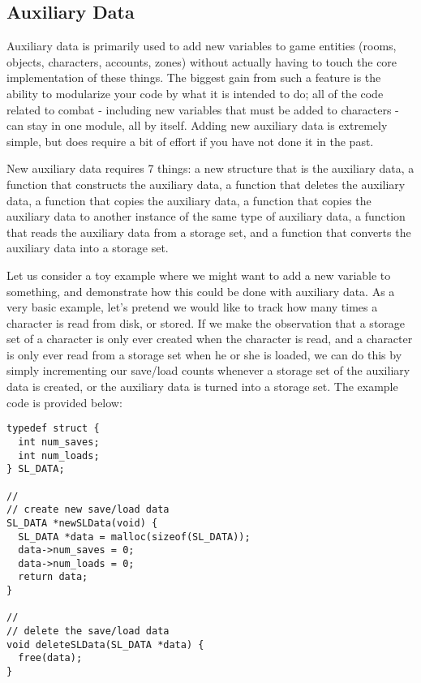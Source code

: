 \documentclass[fignum,doc]{article}
\begin{document}
\begin{doublespace}
\section{Auxiliary Data}
Auxiliary data is primarily used to add new variables to game entities (rooms, objects, characters, accounts, zones) without actually having to touch the core implementation of these things. The biggest gain from such a feature is the ability to modularize your code by what it is intended to do; all of the code related to combat - including new variables that must be added to characters - can stay in one module, all by itself. Adding new auxiliary data is extremely simple, but does require a bit of effort if you have not done it in the past. 

New auxiliary data requires 7 things: a new structure that is the auxiliary data, a function that constructs the auxiliary data, a function that deletes the auxiliary data, a function that copies the auxiliary data, a function that copies the auxiliary data to another instance of the same type of auxiliary data, a function that reads the auxiliary data from a storage set, and a function that converts the auxiliary data into a storage set.

Let us consider a toy example where we might want to add a new variable to something, and demonstrate how this could be done with auxiliary data. As a very basic example, let's pretend we would like to track how many times a character is read from disk, or stored. If we make the observation that a storage set of a character is only ever created when the character is read, and a character is only ever read from a storage set when he or she is loaded, we can do this by simply incrementing our save/load counts whenever a storage set of the auxiliary data is created, or the auxiliary data is turned into a storage set. The example code is provided below:

\begin{singlespace} \begin{verbatim}
typedef struct {
  int num_saves;
  int num_loads;
} SL_DATA;

//
// create new save/load data
SL_DATA *newSLData(void) {
  SL_DATA *data = malloc(sizeof(SL_DATA));
  data->num_saves = 0;
  data->num_loads = 0;
  return data;
}

//
// delete the save/load data
void deleteSLData(SL_DATA *data) {
  free(data);
}


\end{verbatim}
\end{singlespace}
\end{doublespace}
\end{document}
